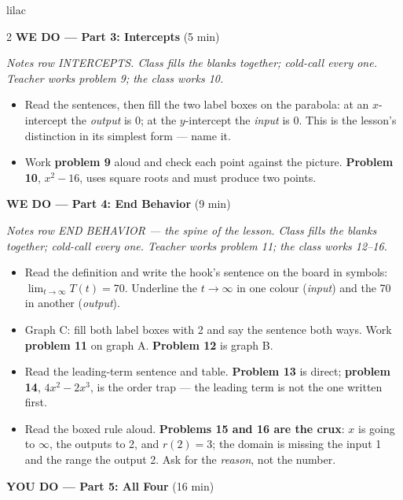 \documentclass[10pt]{article}
\begin{document}
\begin{skillbox}{lilac}
\begin{multicols}{2}
\textbf{WE DO --- Part 3: Intercepts} (5 min)

\textit{Notes row INTERCEPTS. Class fills the blanks together; cold-call every one. Teacher
works problem 9; the class works 10.}
\begin{itemize}
  \item Read the sentences, then fill the two label boxes on the parabola: at an $x$-intercept
        the \textit{output} is 0; at the $y$-intercept the \textit{input} is 0. This is the
        lesson's distinction in its simplest form --- name it.
  \item Work \textbf{problem 9} aloud and check each point against the picture.
        \textbf{Problem 10}, $x^2 - 16$, uses square roots and must produce two points.
\end{itemize}

\textbf{WE DO --- Part 4: End Behavior} (9 min)

\textit{Notes row END BEHAVIOR --- the spine of the lesson. Class fills the blanks together;
cold-call every one. Teacher works problem 11; the class works 12--16.}
\begin{itemize}
  \item Read the definition and write the hook's sentence on the board in symbols:
        $\lim_{t \to \infty} T(t) = 70$. Underline the $t \to \infty$ in one colour
        (\textit{input}) and the 70 in another (\textit{output}).
  \item Graph C: fill both label boxes with 2 and say the sentence both ways.
        Work \textbf{problem 11} on graph A. \textbf{Problem 12} is graph B.
  \item Read the leading-term sentence and table. \textbf{Problem 13} is direct;
        \textbf{problem 14}, $4x^2 - 2x^3$, is the order trap --- the leading term is not the
        one written first.
  \item Read the boxed rule aloud. \textbf{Problems 15 and 16 are the crux}: $x$ is going to
        $\infty$, the outputs to 2, and $r(2) = 3$; the domain is missing the input 1 and the
        range the output 2. Ask for the \textit{reason}, not the number.
\end{itemize}

\textbf{YOU DO --- Part 5: All Four} (16 min)


\end{multicols}
\end{skillbox}
\end{document}
